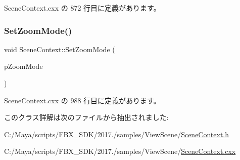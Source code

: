  Scene\+Context.\+cxx の 872 行目に定義があります。

\mbox{\label{class_scene_context_a1e6f52aae39dab1278852e2bbe44ffb0}} 
\subsubsection{\texorpdfstring{Set\+Zoom\+Mode()}{SetZoomMode()}}
{\footnotesize\ttfamily void Scene\+Context\+::\+Set\+Zoom\+Mode (\begin{DoxyParamCaption}\item[{\hyperlink{class_scene_context_a06de9da0c18152a74673a8ed829abf78}{Camera\+Zoom\+Mode}}]{p\+Zoom\+Mode }\end{DoxyParamCaption})}



 Scene\+Context.\+cxx の 988 行目に定義があります。



このクラス詳解は次のファイルから抽出されました\+:\begin{DoxyCompactItemize}
\item 
C\+:/\+Maya/scripts/\+F\+B\+X\+\_\+\+S\+D\+K/2017./samples/\+View\+Scene/\hyperlink{_scene_context_8h}{Scene\+Context.\+h}\item 
C\+:/\+Maya/scripts/\+F\+B\+X\+\_\+\+S\+D\+K/2017./samples/\+View\+Scene/\hyperlink{_scene_context_8cxx}{Scene\+Context.\+cxx}\end{DoxyCompactItemize}
